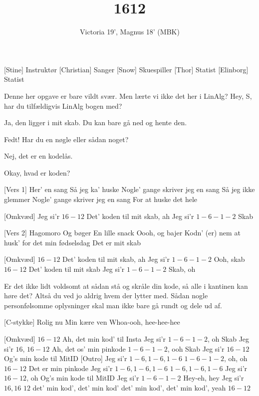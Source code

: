 \documentclass[a4paper,11pt]{article}
\title{1612}
\author{Victoria 19', Magnus 18' (MBK)}
\begin{document}
\maketitle

\begin{roles}
[Stine] Instruktør
[Christian] Sanger
[Snow] Skuespiller
[Thor] Statist
[Elinborg] Statist
\end{roles}


\begin{song}
 Denne her opgave er bare vildt svær. Men lærte vi ikke det her i LinAlg? Hey, S, har du tilfældigvis LinAlg bogen med?

 Ja, den ligger i mit skab. Du kan bare gå ned og hente den. 

 Fedt! Har du en nøgle eller sådan noget?

 Nej, det er en kodelås.

 Okay, hvad er koden?

[Vers 1] Her' en sang
Så jeg ka' huske
Nogle' gange skriver jeg en sang
Så jeg ikke glemmer
Nogle' gange skriver jeg en sang
For at huske det hele

[Omkvæd] Jeg si'r $16-12$
Det' koden til mit skab, ah
Jeg si'r $1-6-1-2$
Skab

[Vers 2] Hagomoro
Og bøger
En lille snack 
Oooh, og bajer 
Kodn' (er) nem at husk' for det min fødselsdag 
Det er mit skab

[Omkvæd] $16-12$
Det' koden til mit skab, ah
Jeg si'r $1-6-1-2$
Ooh, skab
$16-12$
Det' koden til mit skab
Jeg si'r $1-6-1-2$
Skab, oh

 Er det ikke lidt voldsomt at sådan stå og skråle din kode, så alle i kantinen kan høre det? Altså du ved jo aldrig hvem der lytter med. Sådan nogle personfølsomme oplysninger skal man ikke bare gå rundt og dele ud af. 

[C-stykke] Rolig nu
Min kære ven
Whoa-ooh, hee-hee-hee

[Omkvæd] $16-12$
Ah, det min kod' til Insta
Jeg si'r $1-6-1-2$, oh
Skab
Jeg si'r $16$, $16-12$
Ah, det os' min pinkode
$1-6-1-2$, ooh
Skab
Jeg si'r $16-12$
Og's min kode til MitID
[Outro] Jeg si'r $1-6, 1-6, 1-6$
$1-6-1-2$, oh, oh
$16-12$
Det er min pinkode
Jeg si'r $1-6, 1-6, 1-6$
$1-6, 1-6, 1-6$
Jeg si'r $16-12$, oh
Og's min kode til MitID
Jeg si'r $1-6-1-2$
Hey-eh, hey
Jeg si'r $16, 16$
$12$ det' min kod', det' min kod'
det' min kod', det' min kod', yeah
$16-12$
  
\end{song}
\end{document}
